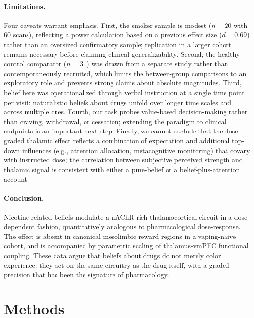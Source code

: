 \documentclass[11pt]{article}
\begin{document}
\paragraph{Limitations.} Four caveats warrant emphasis. First, the smoker sample is modest ($n=20$ with 60 scans), reflecting a power calculation based on a previous effect size ($d=0.69$) rather than an oversized confirmatory sample; replication in a larger cohort remains necessary before claiming clinical generalizability. Second, the healthy-control comparator ($n=31$) was drawn from a separate study rather than contemporaneously recruited, which limits the between-group comparisons to an exploratory role and prevents strong claims about absolute magnitudes. Third, belief here was operationalized through verbal instruction at a single time point per visit; naturalistic beliefs about drugs unfold over longer time scales and across multiple cues. Fourth, our task probes value-based decision-making rather than craving, withdrawal, or cessation; extending the paradigm to clinical endpoints is an important next step. Finally, we cannot exclude that the dose-graded thalamic effect reflects a combination of expectation and additional top-down influences (e.g., attention allocation, metacognitive monitoring) that covary with instructed dose; the correlation between subjective perceived strength and thalamic signal is consistent with either a pure-belief or a belief-plus-attention account.

\paragraph{Conclusion.} Nicotine-related beliefs modulate a nAChR-rich thalamocortical circuit in a dose-dependent fashion, quantitatively analogous to pharmacological dose-response. The effect is absent in canonical mesolimbic reward regions in a vaping-naive cohort, and is accompanied by parametric scaling of thalamus-vmPFC functional coupling. These data argue that beliefs about drugs do not merely color experience: they act on the same circuitry as the drug itself, with a graded precision that has been the signature of pharmacology.

\section{Methods}
\end{document}
